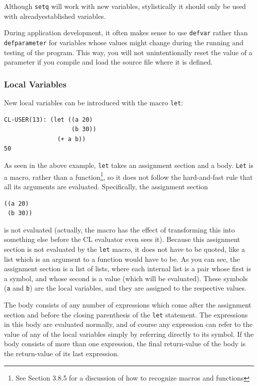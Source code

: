 Although \texttt{setq} will work with new variables, stylistically it should only be used with alreadyestablished variables.

During application development, it often makes sense to use \texttt{defvar} rather than \texttt{defparameter}
for variables whose values might change during the running and testing of the program. This
way, you will not unintentionally reset the value of a parameter if you compile and load the
source file where it is defined.

\subsubsection{Local Variables}

New local variables can be introduced with the macro \texttt{let}:

\begin{verbatim}
CL-USER(13): (let ((a 20)
                   (b 30))
               (+ a b))
50
\end{verbatim}

As seen in the above example, \texttt{let} takes an assignment section and a body. \texttt{Let} is a macro,
rather than a function\footnote{See Section 3.8.5 for a discussion of how to recognize macros and functions}, so it does not follow the hard-and-fast rule that all its arguments
are evaluated. Specifically, the assignment section

\begin{verbatim}
((a 20)
 (b 30))
\end{verbatim}

is not evaluated (actually, the macro has the effect of transforming this into something else
before the CL evaluator even sees it). Because this assignment section is not evaluated by
the \texttt{let} macro, it does not have to be quoted, like a list which is an argument to a function
would have to be. As you can see, the assignment section is a list of lists, where each
internal list is a pair whose first is a symbol, and whose second is a value (which will be
evaluated). These symbols (\texttt{a} and \texttt{b}) are the local variables, and they are assigned to the
respective values.

The body consists of any number of expressions which come after the assignment section
and before the closing parenthesis of the \texttt{let} statement. The expressions in this body are
evaluated normally, and of course any expression can refer to the value of any of the local
variables simply by referring directly to its symbol. If the body consists of more than one
expression, the final return-value of the body is the return-value of its last expression.

